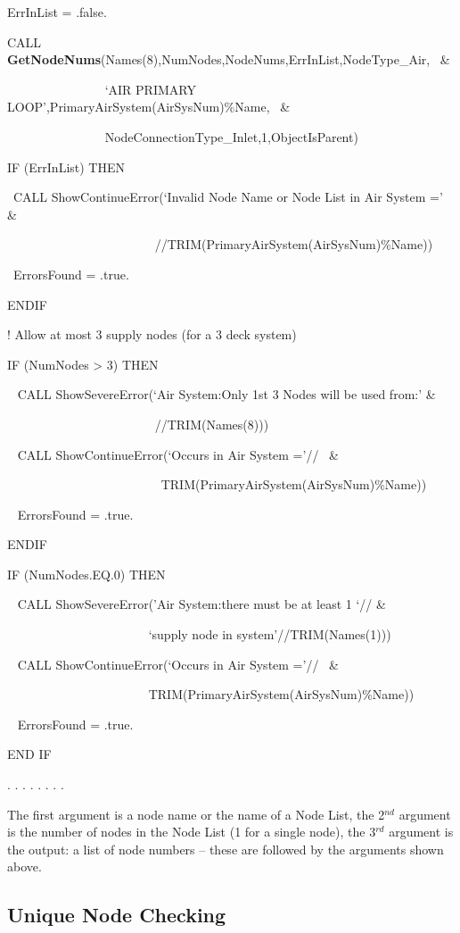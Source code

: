 ErrInList = .false.

CALL \textbf{GetNodeNums}(Names(8),NumNodes,NodeNums,ErrInList,NodeType\_Air,~ \&

~~~~~~~~~~~~~~~ `AIR PRIMARY LOOP',PrimaryAirSystem(AirSysNum)\%Name,~ \&

~~~~~~~~~~~~~~~ NodeConnectionType\_Inlet,1,ObjectIsParent)

IF (ErrInList) THEN

~CALL ShowContinueError(`Invalid Node Name or Node List in Air System =' \&

~~~~~~~~~~~~~~~~~~~~~~~ //TRIM(PrimaryAirSystem(AirSysNum)\%Name))

~ErrorsFound = .true.

ENDIF

! Allow at most 3 supply nodes (for a 3 deck system)

IF (NumNodes \textgreater{} 3) THEN

~ CALL ShowSevereError(`Air System:Only 1st 3 Nodes will be used from:' \&

~~~~~~~~~~~~~ ~~~~~~~~~~//TRIM(Names(8)))

~ CALL ShowContinueError(`Occurs in Air System ='//~ \&

~~~~~~~~~~~~~~~~~~~~~~~~ TRIM(PrimaryAirSystem(AirSysNum)\%Name))

~ ErrorsFound = .true.

ENDIF

IF (NumNodes.EQ.0) THEN

~ CALL ShowSevereError('Air System:there must be at least 1 `// \&

~~~~~~~~~~~~~~~~~~~~~~ `supply node in system'//TRIM(Names(1)))

~ CALL ShowContinueError(`Occurs in Air System ='//~ \&

~~~~~~~~~~~~~~~~~~~~~~ TRIM(PrimaryAirSystem(AirSysNum)\%Name))

~ ErrorsFound = .true.

END IF

. . . . . . . .

The first argument is a node name or the name of a Node List, the 2\(^{nd}\) argument is the number of nodes in the Node List (1 for a single node), the 3\(^{rd}\) argument is the output: a list of node numbers -- these are followed by the arguments shown above.

\subsection{Unique Node Checking}\label{unique-node-checking}

